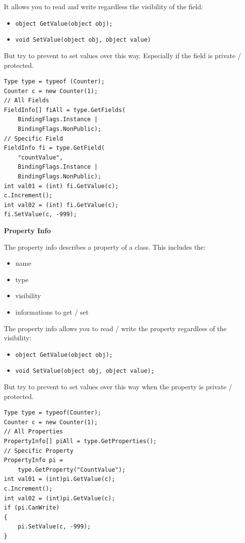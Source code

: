 \documentclass[11pt,twoside,landscape]{article}
\begin{document}
\begin{multicols}{3}
It allows you to read and write regardless the visibility of the field:
\begin{itemize}
\item \texttt{object GetValue(object obj);}
\item \texttt{void SetValue(object obj, object value)}
\end{itemize}


But try to prevent to set values over this way.
Especially if the field is private / protected.


\lstset{language=csharp,label= ,caption= ,captionpos=b,numbers=none}
\begin{lstlisting}
Type type = typeof (Counter);
Counter c = new Counter(1);
// All Fields
FieldInfo[] fiAll = type.GetFields(
    BindingFlags.Instance |
    BindingFlags.NonPublic);
// Specific Field
FieldInfo fi = type.GetField(
    "countValue",
    BindingFlags.Instance |
    BindingFlags.NonPublic);
int val01 = (int) fi.GetValue(c);
c.Increment();
int val02 = (int) fi.GetValue(c);
fi.SetValue(c, -999);
\end{lstlisting}

\textbf{Property Info}

The property info describes a property of a class.
This includes the:
\begin{itemize}
\item name
\item type
\item visibility
\item informations to get / set
\end{itemize}


The property info allows you to read / write the property regardless of the visibility:
\begin{itemize}
\item \texttt{object GetValue(object obj);}
\item \texttt{void SetValue(object obj, object value);}
\end{itemize}


But try to prevent to set values over this way when the property is private / protected.


\lstset{language=csharp,label= ,caption= ,captionpos=b,numbers=none}
\begin{lstlisting}
Type type = typeof(Counter);
Counter c = new Counter(1);
// All Properties
PropertyInfo[] piAll = type.GetProperties();
// Specific Property
PropertyInfo pi =
    type.GetProperty("CountValue");
int val01 = (int)pi.GetValue(c);
c.Increment();
int val02 = (int)pi.GetValue(c);
if (pi.CanWrite)
{
    pi.SetValue(c, -999);
}
\end{lstlisting}



\end{multicols}
\end{document}
